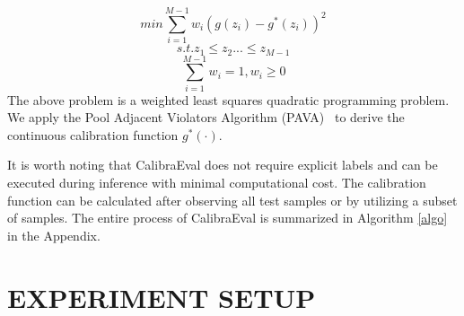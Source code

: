 \documentclass[sigconf]{acmart}
\begin{document}
\begin{equation} \label{eqn-16}
min \sum_{i=1}^{M-1}w_i(g(z_i)-g^*(z_i))^2 
\end{equation}
\begin{equation} \label{eqn-17}
s.t. z_1 \le z_2 ... \le z_{M-1} 
\end{equation}
\begin{equation} \label{eqn-18}
\sum_{i=1}^{M-1}w_i = 1, w_i \ge 0
\end{equation} 
The above problem is a weighted least squares quadratic programming problem. We apply the Pool Adjacent Violators Algorithm (PAVA)~\cite{zadora2014pool} to derive the continuous calibration function $g^*(\cdot)$.


It is worth noting that CalibraEval does not require explicit labels and can be executed during inference with minimal computational cost. The calibration function can be calculated after observing all test samples or by utilizing a subset of samples.
The entire process of CalibraEval is summarized in Algorithm \ref{algo} in the Appendix.


    
    
    
    
    





\section{EXPERIMENT SETUP}
\end{document}

